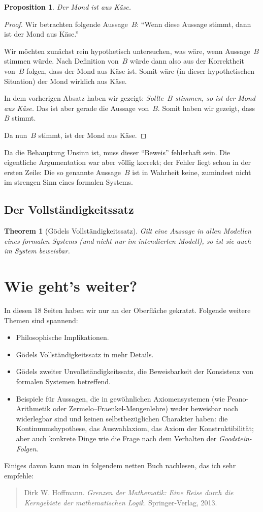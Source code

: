 \documentclass[twoside]{../zirkelblatt1415}
\theoremstyle{definition}
\theoremstyle{plain}
\newtheorem{prop}[defn]{Proposition}
\newtheorem{thm}[defn]{Theorem}
\theoremstyle{remark}
\begin{document}
\begin{prop}Der Mond ist aus Käse.\end{prop}
\begin{proof}Wir betrachten folgende Aussage~$B$: "`Wenn diese Aussage stimmt,
dann ist der Mond aus Käse."'

Wir möchten zunächst rein hypothetisch untersuchen, was wäre, wenn Aussage~$B$
stimmen würde. Nach Definition von~$B$ würde dann also aus der Korrektheit
von~$B$ folgen, dass der Mond aus Käse ist. Somit wäre (in dieser
hypothetischen Situation) der Mond wirklich aus Käse.

In dem vorherigen Absatz haben wir gezeigt: \emph{Sollte~$B$ stimmen, so ist der Mond
aus Käse.} Das ist aber gerade die Aussage von~$B$. Somit haben wir gezeigt,
dass~$B$ stimmt.

Da nun~$B$ stimmt, ist der Mond aus Käse.
\end{proof}

Da die Behauptung Unsinn ist, muss dieser "`Beweis"' fehlerhaft sein. Die
eigentliche Argumentation war aber völlig korrekt; der Fehler liegt schon in der
ersten Zeile: Die so genannte Aussage~$B$ ist in Wahrheit keine, zumindest
nicht im strengen Sinn eines formalen Systems.


\subsection{Der Vollständigkeitssatz}

\begin{thm}[Gödels Vollständigkeitssatz]
Gilt eine Aussage in allen Modellen eines formalen Systems (und nicht nur im
intendierten Modell), so ist sie auch im System beweisbar.
\end{thm}


\section{Wie geht's weiter?}

In diesen 18 Seiten haben wir nur an der Oberfläche gekratzt. Folgende weitere
Themen sind spannend:
\begin{itemize}
\item Philosophische Implikationen.
\item Gödels Vollständigkeitssatz in mehr Details.
\item Gödels zweiter Unvollständigkeitssatz, die Beweisbarkeit der Konsistenz
von formalen Systemen betreffend.
\item Beispiele für Aussagen, die in gewöhnlichen Axiomensystemen (wie
Peano-Arith\-me\-tik oder Zermelo--Fraenkel-Mengenlehre) weder beweisbar noch
widerlegbar sind und keinen selbstbezüglichen Charakter haben: die
Kontinuumshypothese, das Auswahlaxiom, das Axiom der Konstruktibilität; aber
auch konkrete Dinge wie die Frage nach dem Verhalten der
\emph{Goodstein-Folgen}.
\end{itemize}

Einiges davon kann man in folgendem netten Buch nachlesen, das ich sehr
empfehle:
\begin{quote}
Dirk W. Hoffmann. \emph{Grenzen der Mathematik: Eine Reise durch die
Kerngebiete der mathematischen Logik}. Springer-Verlag, 2013.
\end{quote}
\end{document}
